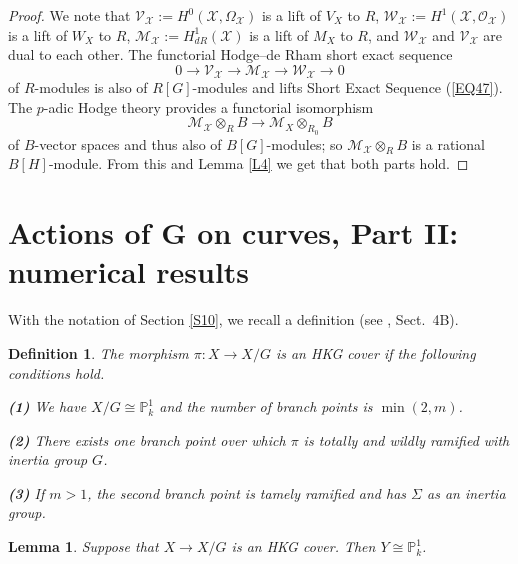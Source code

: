 \documentclass[11pt]{amsart}
\newtheorem{definition}[theorem]{Definition}
\newtheorem{lemma}[theorem]{Lemma}
\begin{document}
\begin{proof}
We note that $\mathcal V_{\mathcal X}:=H^0(\mathcal X,\Omega_{\mathcal X})$ is a lift of $V_X$ to $R$, $\mathcal W_{\mathcal X}:=H^1(\mathcal X,\mathcal O_{\mathcal X})$ is a lift of $W_X$ to $R$, $\mathcal M_{\mathcal X}:=H^1_{dR}(\mathcal X)$ is a lift of $M_X$ to $R$, and $\mathcal W_{\mathcal X}$ and $\mathcal V_{\mathcal X}$ are dual to each other. The functorial Hodge--de Rham short exact sequence
\begin{equation}\label{EQ48}
0\rightarrow\mathcal V_{\mathcal X}\rightarrow\mathcal M_{\mathcal X}\rightarrow\mathcal W_{\mathcal X}\rightarrow 0
\end{equation}
of $R$-modules is also of $R[G]$-modules and lifts Short Exact Sequence (\ref{EQ47}). The $p$-adic Hodge theory provides a functorial isomorphism
\begin{equation}\label{EQ49}
\mathcal M_{\mathcal X}\otimes_R B\rightarrow\mathcal M_X\otimes_{R_0} B
\end{equation}
of $B$-vector spaces and thus also of $B[G]$-modules; so $\mathcal M_{\mathcal X}\otimes_R B$ is a rational $B[H]$-module. From this and Lemma \ref{L4} we get that both parts hold.\end{proof}

\section{Actions of G on curves, Part II: numerical results}\label{S11}

With the notation of Section \ref{S10}, we recall a definition (see \cite{P}, Sect.\ 4B).

\begin{definition}\label{D5}
The morphism $\pi:X\rightarrow X/G$ is an \emph{HKG cover} if the following conditions hold.

\medskip
{\bf (1)} We have $X/G\cong \mathbb P_k^1$ and the number of branch points is $\min(2,m)$.

\smallskip
{\bf (2)} There exists one branch point over which $\pi$ is totally and wildly ramified with inertia group $G$. 

\smallskip
{\bf (3)} If $m>1$, the second branch point is tamely ramified and has $\Sigma$ as an inertia group.
\end{definition}

\begin{lemma}\label{L8} Suppose that $X\rightarrow X/G$ is an HKG cover. Then $Y\cong\mathbb P^1_k$.
\end{lemma}
\end{document}
